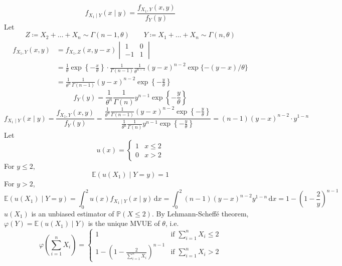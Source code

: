 \[
f_{X_1\mid Y}(x\mid y)=\frac{f_{X_1,Y}(x,y)}{f_{Y}(y)}
\]
Let
\[
Z\coloneqq X_2+\dots+X_n\sim \Gamma(n-1,\theta)\qquad Y\coloneqq X_1+\dots+X_n\sim \Gamma(n,\theta)
\]
\[
\begin{aligned}
f_{X_1,Y}(x,y) & =f_{X_1,Z}(x,y-x)\begin{vmatrix}
1 & 0 \\
-1 & 1
\end{vmatrix} \\
 & =\frac{1}{\theta}\exp \left\{  -\frac{x}{\theta}  \right\}\cdot\frac{1}{\Gamma(n-1)}\frac{1}{\theta^{n-1}}(y-x)^{n-2}\exp \{ -(y-x)/\theta \} \\
 & =\frac{1}{\theta^{n}}\frac{1}{\Gamma(n-1)}(y-x)^{n-2}\exp \left\{  -\frac{y}{\theta}  \right\}
\end{aligned}
\]
\[
f_{Y}(y)=\frac{1}{\theta^{n}}\frac{1}{\Gamma(n)}y^{n-1}\exp \left\{  -\frac{y}{\theta}  \right\}
\]
\[
f_{X_1\mid Y}(x\mid y)=\frac{f_{X_1,Y}(x,y)}{f_{Y}(y)}=\frac{\frac{1}{\theta^{n}}\frac{1}{\Gamma(n-1)}(y-x)^{n-2}\exp \left\{  -\frac{y}{\theta}  \right\}}{\frac{1}{\theta^{n}}\frac{1}{\Gamma(n)}y^{n-1}\exp \left\{  -\frac{y}{\theta}  \right\}}=(n-1)(y-x)^{n-2}\cdot y^{1-n}
\]
Let
\[
u(x)=\begin{cases}
1 & x\leq 2 \\
0 & x>2 
\end{cases}
\]
For $y\leq2$,
\[
\mathbb{E}(u(X_1)\mid Y=y)=1
\]
For $y>2$,
\[
\mathbb{E}(u(X_1)\mid Y=y)=\int_{0}^{2} u(x)f_{X_1 \mid Y}(x\mid y) \, \mathrm{d}x =\int_{0}^{2} (n-1)(y-x)^{n-2}y^{1-n} \, \mathrm{d}x =1-\left( 1-\frac{2}{y} \right)^{n-1}
\]
$u(X_1)$ is an unbiased estimator of $\mathbb{P}(X\leq2)$. By Lehmann-Scheffé theorem, $\varphi(Y)=\mathbb{E}(u(X_1)\mid Y)$ is the unique MVUE of $\theta$, i.e.
\[
\varphi\left( \sum_{i=1}^{n} X_i \right)=\begin{cases}
1 & \text{if }\sum_{i=1}^{n} X_i\leq 2 \\
1-\left( 1-\frac{2}{\sum_{i=1}^{n} X_i} \right)^{n-1} & \text{if }\sum_{i=1}^{n} X_i>2
\end{cases}
\]
